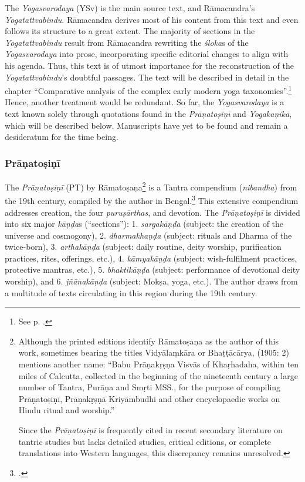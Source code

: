 The \emph{Yogasvarodaya} (YSv) is the main source text, and Rāmacandra's \emph{Yogatattvabindu}. Rāmacandra derives most of his content from this text and even follows its structure to a great extent. The majority of sections in the \emph{Yogatattvabindu} result from Rāmacandra rewriting the \emph{śloka}s of the \emph{Yogasvarodaya} into prose, incorporating specific editorial changes to align with his agenda. Thus, this text is of utmost importance for the reconstruction of the \emph{Yogatattvabindu}'s doubtful passages. The text will be described in detail in the chapter ``Comparative analysis of the complex early modern yoga taxonomies''.\footnote{See p. \pageref{yogasvarodayadescription}.} Hence, another treatment would be redundant. So far, the \emph{Yogasvarodaya} is a text known solely through quotations found in the \emph{Prāṇatoṣiṇī} and \emph{Yogakaṇikā}, which will be described below. Manuscripts have yet to be found and remain a desideratum for the time being. 

\subsubsection{Prāṇatoṣiṇī}

The \textit{Prāṇatoṣiṇī} (PT) by Rāmatoṣaṇa\footnote{Although the printed editions identify Rāmatoṣaṇa as the author of this work, sometimes bearing the titles Vidyālaṃkāra or Bhaṭṭācārya, \citeauthor{shastri1905} (1905: 2) mentions another name: ``Babu Prāṇakṛṣṇa Visvās of Khaṛhadaha, within ten miles of Calcutta, collected in the beginning of the nineteenth century a large number of Tantra, Purāṇa and Smṛti MSS., for the purpose of compiling Prāṇatoṣiṇī, Prāṇakṛṣṇā Kriyāmbudhi and other encyclopaedic works on Hindu ritual and worship.''

Since the \textit{Prāṇatoṣiṇī} is frequently cited in recent secondary literature on tantric studies but lacks detailed studies, critical editions, or complete translations into Western languages, this discrepancy remains unresolved.} is a Tantra compendium (\textit{nibandha}) from the 19th century, compiled by the author in Bengal.\footnote{\cite{amatosana}.} This extensive compendium addresses creation, the four \textit{puruṣārthas}, and devotion. The \textit{Prāṇatoṣiṇī} is divided into six major \textit{kāṇḍa}s (``sections''): 1. \textit{sargakāṇḍa} (subject: the creation of the universe and cosmogony), 2. \textit{dharmakhaṇḍa} (subject: rituals and Dharma of the twice-born), 3. \textit{arthakāṇḍa} (subject: daily routine, deity worship, purification practices, rites, offerings, etc.), 4. \textit{kāmyakāṇḍa} (subject: wish-fulfilment practices, protective mantras, etc.), 5. \textit{bhaktikāṇḍa} (subject: performance of devotional deity worship), and 6. \textit{jñānakāṇḍa} (subject: Mokṣa, yoga, etc.). The author draws from a multitude of texts circulating in this region during the 19th century.

